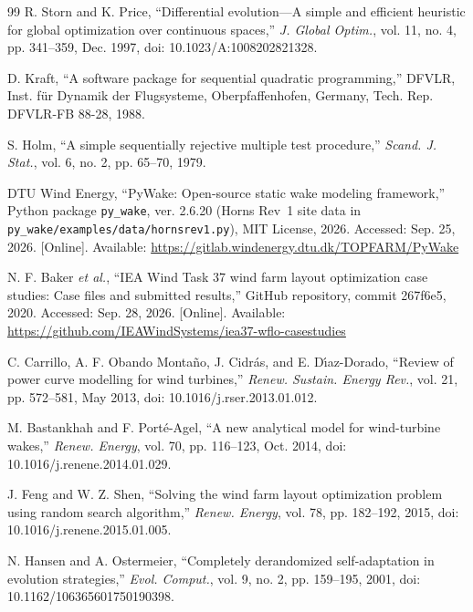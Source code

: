 \begin{thebibliography}{99}
R. Storn and K. Price, ``Differential evolution---A simple and efficient heuristic for global optimization over continuous spaces,'' \textit{J. Global Optim.}, vol. 11, no. 4, pp. 341--359, Dec. 1997, doi: 10.1023/A:1008202821328.

D. Kraft, ``A software package for sequential quadratic programming,'' DFVLR, Inst. f\"ur Dynamik der Flugsysteme, Oberpfaffenhofen, Germany, Tech. Rep. DFVLR-FB 88-28, 1988.

S. Holm, ``A simple sequentially rejective multiple test procedure,'' \textit{Scand. J. Stat.}, vol. 6, no. 2, pp. 65--70, 1979.

DTU Wind Energy, ``PyWake: Open-source static wake modeling framework,'' Python package \texttt{py\_wake}, ver. 2.6.20 (Horns Rev~1 site data in \texttt{py\_wake/examples/data/hornsrev1.py}), MIT License, 2026. Accessed: Sep. 25, 2026. [Online]. Available: \url{https://gitlab.windenergy.dtu.dk/TOPFARM/PyWake}

N. F. Baker \textit{et al.}, ``IEA Wind Task 37 wind farm layout optimization case studies: Case files and submitted results,'' GitHub repository, commit 267f6e5, 2020. Accessed: Sep. 28, 2026. [Online]. Available: \url{https://github.com/IEAWindSystems/iea37-wflo-casestudies}

C. Carrillo, A. F. Obando Monta\~no, J. Cidr\'as, and E. D\'{\i}az-Dorado, ``Review of power curve modelling for wind turbines,'' \textit{Renew. Sustain. Energy Rev.}, vol. 21, pp. 572--581, May 2013, doi: 10.1016/j.rser.2013.01.012.

M. Bastankhah and F. Port\'e-Agel, ``A new analytical model for wind-turbine wakes,'' \textit{Renew. Energy}, vol. 70, pp. 116--123, Oct. 2014, doi: 10.1016/j.renene.2014.01.029.

J. Feng and W. Z. Shen, ``Solving the wind farm layout optimization problem using random search algorithm,'' \textit{Renew. Energy}, vol. 78, pp. 182--192, 2015, doi: 10.1016/j.renene.2015.01.005.

N. Hansen and A. Ostermeier, ``Completely derandomized self-adaptation in evolution strategies,'' \textit{Evol. Comput.}, vol. 9, no. 2, pp. 159--195, 2001, doi: 10.1162/106365601750190398.

\end{thebibliography}

